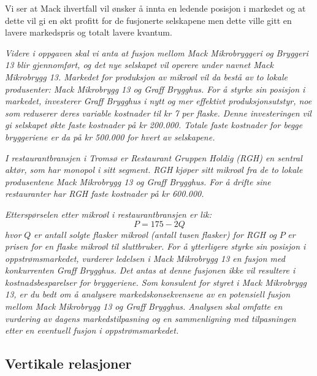 \documentclass[
  12pt,
  a4paper,
  DIV=11,
  numbers=noendperiod]{scrartcl}
\begin{document}
Vi ser at Mack ihvertfall vil ønsker å innta en ledende posisjon i
markedet og at dette vil gi en økt profitt for de fusjonerte selskapene
men dette ville gitt en lavere markedspris og totalt lavere kvantum.

\clearpage

\textit{Videre i oppgaven skal vi anta at fusjon mellom Mack Mikrobryggeri og Bryggeri 13 blir gjennomført, og det nye selskapet vil operere under navnet Mack Mikrobrygg 13. Markedet for produksjon av mikroøl vil da bestå av to lokale produsenter: Mack Mikrobrygg 13 og Graff Brygghus. For å styrke sin posisjon i markedet, investerer Graff Brygghus i nytt og mer effektivt produksjonsutstyr, noe som reduserer deres variable kostnader til kr 7 per flaske. Denne investeringen vil gi selskapet økte faste kostnader på kr 200.000. Totale faste kostnader for begge bryggeriene er da på kr 500.000 for hvert av selskapene.}

\textit{I restaurantbransjen i Tromsø er Restaurant Gruppen Holdig (RGH) en sentral aktør, som har monopol i sitt segment. RGH kjøper sitt mikroøl fra de to lokale produsentene Mack Mikrobrygg 13 og Graff Brygghus. For å drifte sine restauranter har RGH faste kostnader på kr 600.000.}

\textit{Etterspørselen etter mikroøl i restaurantbransjen er lik:} 
$$
P = 175 - 2Q
$$ 
\textit{hvor }$Q$\textit{ er antall solgte flasker mikroøl (antall tusen flasker) for RGH og }$P$\textit{ er prisen for en flaske mikroøl til sluttbruker. For å ytterligere styrke sin posisjon i oppstrømsmarkedet, vurderer ledelsen i Mack Mikrobrygg 13 en fusjon med konkurrenten Graff Brygghus. Det antas at denne fusjonen ikke vil resultere i kostnadsbesparelser for bryggeriene. Som konsulent for styret i Mack Mikrobrygg 13, er du bedt om å analysere markedskonsekvensene av en potensiell fusjon mellom Mack Mikrobrygg 13 og Graff Brygghus. Analysen skal omfatte en vurdering av dagens markedstilpasning og en sammenligning med tilpasningen etter en eventuell fusjon i oppstrømsmarkedet.}

\subsection{Vertikale relasjoner}\label{vertikale-relasjoner}
\end{document}
